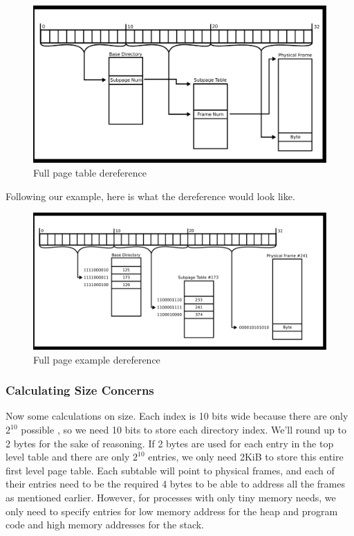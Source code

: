 \begin{figure}[H]
  \centering
  \includegraphics[width=1.0\textwidth]{ipc/drawings/multi_level_split.eps}
  \caption{Full page table dereference}
\end{figure}

Following our example, here is what the dereference would look like.

\begin{figure}[H]
  \centering
  \includegraphics[width=1.0\textwidth]{ipc/drawings/multi_level_filled.eps}
  \caption{Full page example dereference}
\end{figure}

\subsubsection{Calculating Size Concerns}

Now some calculations on size.
Each  index is 10 bits wide because there are only $2^{10}$ possible , so we need 10 bits to store each directory index.
We'll round up to 2 bytes for the sake of reasoning.
If 2 bytes are used for each entry in the top level table and there are only $2^{10}$ entries, we only need 2KiB to store this entire first level page table.
Each subtable will point to physical frames, and each of their entries need to be the required 4 bytes to be able to address all the frames as mentioned earlier.
However, for processes with only tiny memory needs, we only need to specify entries for low memory address for the heap and program code and high memory addresses for the stack.

